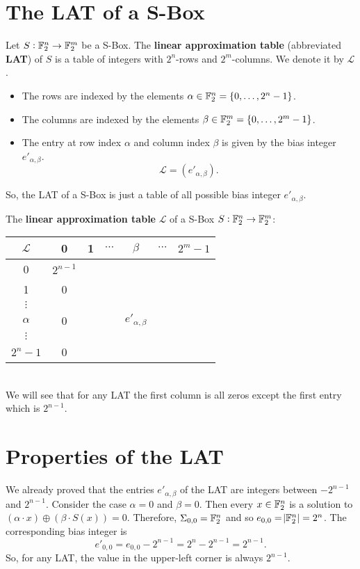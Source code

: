 \section{The LAT of a S-Box}
\begin{tcolorbox}[colback=white,colframe=defcolor,arc=5pt,title={\color{white}\bf The Linear Approximation Table (LAT)}]
\begin{definition}
Let $S:\mathbb{F}_2^n\to\mathbb{F}_2^m$ be a S-Box. The \textbf{linear approximation table} (abbreviated \textbf{LAT}) of $S$ is a table of integers with $2^n$-rows and $2^m$-columns. We denote it by $\mathcal{L}$.
\begin{itemize}
	\item The rows are indexed by the elements $\alpha\in\mathbb{F}_2^n=\set{0,\dots,2^n-1}$.
	\item The columns are indexed by the elements $\beta\in\mathbb{F}_2^m=\set{0,\dots,2^m-1}$.
	\item The entry at row index $\alpha$ and column index $\beta$ is given by the bias integer $e'_{\alpha,\beta}$. \[
	\mathcal{L}=(e'_{\alpha,\beta}).
	\]
\end{itemize}
So, the LAT of a S-Box is just a table of all possible bias integer $e'_{\alpha,\beta}$.
\end{definition}
\end{tcolorbox}
\begin{note}
The \textbf{linear approximation table} $\mathcal{L}$ of a S-Box $S:\mathbb{F}_2^n\to\mathbb{F}_2^m$:
\begin{table}[h!]\centering
\renewcommand{\arraystretch}{1.25}
\begin{tabular}{c||cccccc}
	$\mathcal{L}$ & 0 & 1 & $\cdots$ & $\beta$ & $\cdots$ & $2^{m}-1$\\
	\hline
	\hline
	0 & $2^{n-1}$ \\
	1 & 0 \\
	$\vdots$ &  \\
	$\alpha$ & 0 & & & $e'_{\alpha,\beta}$& \\
	$\vdots$ & \\
	$2^n-1$ & 0 \\
\end{tabular}
\end{table}\\
We will see that for any LAT the first column is all zeros except the first entry which is $2^{n-1}$.
\end{note}

\newpage
\section{Properties of the LAT}
We already proved that the entries $e'_{\alpha,\beta}$ of the LAT are integers between $-2^{n-1}$ and $2^{n-1}$. Consider the case $\alpha=0$ and $\beta=0$. Then every $x\in\mathbb{F}_2^n$ is a solution to $(\alpha\cdot x)\oplus(\beta\cdot S(x))=0$.
Therefore, $\Sigma_{0,0}=\mathbb{F}_2^n$ and so $e_{0,0}=\abs{\mathbb{F}_2^n}=2^n$. The corresponding bias integer is \[
e'_{0,0}=e_{0,0}-2^{n-1}=2^n-2^{n-1}=2^{n-1}.
\] So, for any LAT, the value in the upper-left corner is always $2^{n-1}$.

